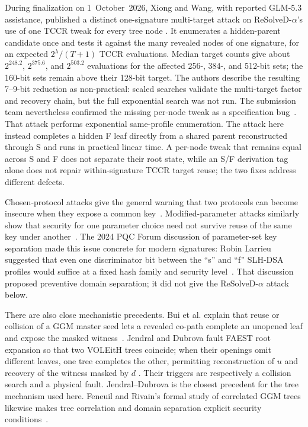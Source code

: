 \documentclass[11pt,a4paper]{article}
\begin{document}
During finalization on 1~October~2026, Xiong and Wang, with reported GLM-5.3
assistance, published a distinct one-signature multi-target attack on
ReSolveD-$\alpha$'s use of one TCCR tweak for every tree node
\cite{xiongwang2026,ngcc-resolved}.  It enumerates a hidden-parent candidate
once and tests it against the many revealed nodes of one signature, for an
expected $2^\lambda/(T+1)$ TCCR evaluations.  Median target counts give about
$2^{248.2}$, $2^{375.6}$, and $2^{503.2}$ evaluations for the affected 256-,
384-, and 512-bit sets; the 160-bit sets remain above their 128-bit target.  The
authors describe the resulting 7--9-bit reduction as non-practical: scaled
searches validate the multi-target factor and recovery chain, but the full
exponential search was not run.  The submission team nevertheless confirmed
the missing per-node tweak as a specification bug~\cite{resolved-team2026}.
That attack performs exponential same-profile enumeration.  The attack here
instead completes a hidden F leaf directly from a shared parent reconstructed
through S and runs in practical linear time.  A per-node tweak that remains
equal across S and F does not separate their root state, while an S/F
derivation tag alone does not repair within-signature TCCR target reuse; the
two fixes address different defects.

Chosen-protocol attacks give the general warning that two protocols can become
insecure when they expose a common key~\cite{kelsey1998}.  Modified-parameter
attacks similarly show that security for one parameter choice need not survive
reuse of the same key under another~\cite{howgrave2004}.  The 2024 PQC Forum
discussion of parameter-set key separation made this issue concrete for modern
signatures: Robin Larrieu suggested that even one discriminator bit between the
``s'' and ``f'' SLH-DSA profiles would suffice at a fixed hash family and
security level~\cite{larrieu2024}.  That discussion proposed preventive domain
separation; it did not give the ReSolveD-$\alpha$ attack below.

There are also close mechanistic precedents.  Bui et al. explain that reuse or
collision of a GGM master seed lets a revealed co-path complete an unopened
leaf and expose the masked witness~\cite[Sec.~3.1]{bui2024}.  Jendral and
Dubrova fault FAEST root expansion so that two VOLEitH trees coincide; when
their openings omit different leaves, one tree completes the other, permitting
reconstruction of $u$ and recovery of the witness masked by $d$
\cite[Sec.~8]{jendral2025}.  Their triggers are respectively a collision search
and a physical fault.  Jendral--Dubrova is the closest precedent for the tree
mechanism used here.  Feneuil and Rivain's formal study of correlated GGM trees
likewise makes tree correlation and domain separation explicit security
conditions~\cite{feneuil2026}.
\end{document}
